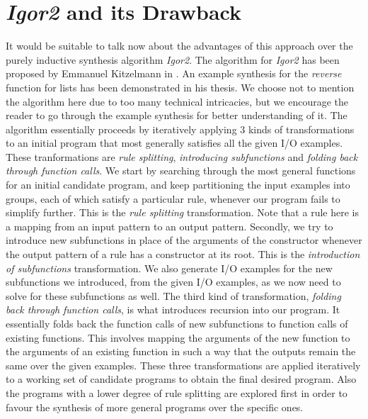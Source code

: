 \section{\emph{Igor2} and its Drawback}
It would be suitable to talk now about the advantages of this approach over the purely inductive synthesis algorithm \emph{Igor2}. The algorithm for \emph{Igor2} has been proposed by Emmanuel Kitzelmann in \cite{kitzelmann2011combined}. An example synthesis for the \emph{reverse} function for lists has been demonstrated in his thesis. We choose not to mention the algorithm here due to too many technical intricacies, but we encourage the reader to go through the example synthesis for better understanding of it. The algorithm essentially proceeds by iteratively applying 3 kinds of transformations to an initial program that most generally satisfies all the given I/O examples. These tranformations are \emph{rule splitting}, \emph{introducing subfunctions} and \emph{folding back through function calls}. We start by searching through the most general functions for an initial candidate program, and keep partitioning the input examples into groups, each of which satisfy a particular rule, whenever our program fails to simplify further. This is the \emph{rule splitting} transformation. Note that a rule here is a mapping from an input pattern to an output pattern. Secondly, we try to introduce new subfunctions in place of the arguments of the constructor whenever the output pattern of a rule has a constructor at its root. This is the \emph{introduction of subfunctions} transformation. We also generate I/O examples for the new subfunctions we introduced, from the given I/O examples, as we now need to solve for these subfunctions as well. The third kind of transformation, \emph{folding back through function calls}, is what introduces recursion into our program. It essentially folds back the function calls of new subfunctions to function calls of existing functions. This involves mapping the arguments of the new function to the arguments of an existing function in such a way that the outputs remain the same over the given examples. These three transformations are applied iteratively to a working set of candidate programs to obtain the final desired program. Also the programs with a lower degree of rule splitting are explored first in order to favour the synthesis of more general programs over the specific ones. \\\\
